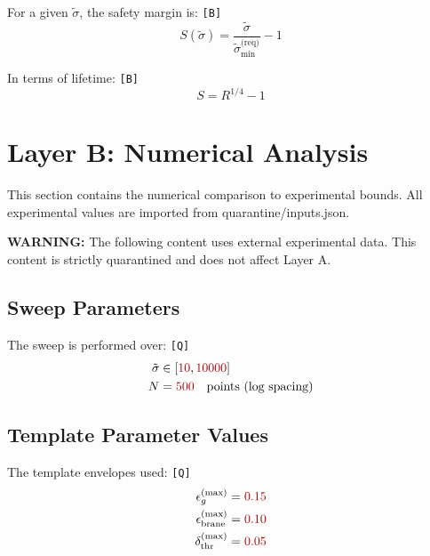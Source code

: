 \documentclass[11pt,a4paper]{article}
\newcommand{\Qval}[1]{\textcolor{red!70!black}{#1}}
\newcommand{\tagQ}{\textcolor{red!70!black}{\texttt{[Q]}}}
\newcommand{\tagB}{\textcolor{purple!70!black}{\texttt{[B]}}}
\theoremstyle{definition}
\begin{document}
For a given $\tilde{\sigma}$, the safety margin is: \tagB{}
\begin{equation}
\label{eq:safety-1}
S(\tilde{\sigma}) = \frac{\tilde{\sigma}}{\tilde{\sigma}_{\min}^{\text{(req)}}} - 1
\end{equation}

In terms of lifetime: \tagB{}
\begin{equation}
\label{eq:safety-2}
S = R^{1/4} - 1
\end{equation}


\section{Layer B: Numerical Analysis}
\label{sec:layer-b}

\begin{quarantinebox}
This section contains the numerical comparison to experimental bounds.
All experimental values are imported from quarantine/inputs.json.

\textbf{WARNING:} The following content uses external experimental data.
This content is strictly quarantined and does not affect Layer A.
\end{quarantinebox}

\subsection{Sweep Parameters}
\label{subsec:sweep-params}

The sweep is performed over: \tagQ{}
\begin{align}
\label{eq:sweep-range}
\tilde{\sigma} &\in [\Qval{10}, \Qval{10000}] \\
\label{eq:sweep-points}
N &= \Qval{500} \quad \text{points (log spacing)}
\end{align}

\subsection{Template Parameter Values}
\label{subsec:template-values}

The template envelopes used: \tagQ{}
\begin{align}
\label{eq:template-eps-g}
\epsilon_g^{\text{(max)}} &= \Qval{0.15} \\
\label{eq:template-eps-brane}
\epsilon_{\text{brane}}^{\text{(max)}} &= \Qval{0.10} \\
\label{eq:template-delta-thr}
\delta_{\text{thr}}^{\text{(max)}} &= \Qval{0.05}
\end{align}
\end{document}
